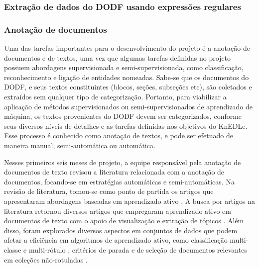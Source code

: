 \documentclass[12pt]{article}
\begin{document}
\subsubsection*{Extração de dados do DODF usando expressões regulares}

\subsubsection*{Anotação de documentos}

\indent Uma das tarefas importantes para o desenvolvimento do projeto é a anotação de documentos e de textos, uma vez que algumas tarefas definidas no projeto possuem abordagens supervisionada e semi-supervisionada, como classificação, reconhecimento e ligação de entidades nomeadas. Sabe-se que os documentos do DODF, e seus textos constituintes (blocos, seções, subseções etc), são coletados e extraídos sem qualquer tipo de categorização. Portanto, para viabilizar a aplicação de métodos supervisionados ou semi-supervisionados de aprendizado de máquina, os textos provenientes do DODF devem ser categorizados, conforme seus diversos níveis de detalhes e as tarefas definidas nos objetivos do KnEDLe. Esse processo é conhecido como anotação de textos, e pode ser efetuado de maneira manual, semi-automática ou automática.

\indent Nesses primeiros seis meses de projeto, a equipe responsável pela anotação de documentos de texto revisou a literatura relacionada com a anotação de documentos, focando-se em estratégias automáticas e semi-automáticas. Na revisão de literatura, tomou-se como ponto de partida os artigos que apresentaram abordagens baseadas em aprendizado ativo \cite{settles_activeLearning_Survey_2009}. A busca por artigos na literatura retornou diversos artigos que empregaram aprendizado ativo em documentos de texto com o apoio de visualização \cite{lulu_etal_alVisualization_acm_wesida_2017} \cite{makki_etl_atrVis_acmTran_KDD} \cite{hamid_etal_acmtransiis_2018} e extração de tópicos \cite{balasubramanyan_etal_mlInkdd_2013} \cite{tuarob_etal_docanotTopicMod_ijdl_2015}. Além disso, foram explorados diversos aspectos em conjuntos de dados que podem afetar a eficiência em algoritmos de aprendizado ativo, como classificação multi-classe \cite{joshi_etal_multiclassAL_cvpr_2009} e multi-rótulo \cite{bishan_etal_multilabelAL_sigkdd_2009}, critérios de parada \cite{jingbo_etal_stopCritAL_acmtranslp_2010} e de seleção de documentos relevantes em coleções não-rotuladas \cite{bouneffouf_expoGradAl_computers_2016}.
\end{document}
